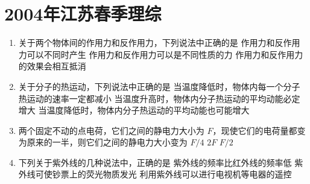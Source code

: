 \documentclass[\gkver]{gaokaozhenti}
\begin{document}
\chapter{2004年江苏春季理综}

\begin{enumerate}
\item
关于两个物体间的作用力和反作用力，下列说法中正确的是
{作用力和反作用力可以不同时产生}
{作用力和反作用力可以是不同性质的力}
{作用力和反作用力的效果会相互抵消}

\item
关于分子的热运动，下列说法中正确的是
{当温度降低时，物体内每一个分子热运动的速率一定都减小}
{当温度升高时，物体内分子热运动的平均动能必定增大}
{当温度降低时，物体内分子热运动的平均动能也可能增大}

\item
两个固定不动的点电荷，它们之间的静电力大小为 $F$，现使它们的电荷量都变为原来的一半，则它们之间的静电力大小变为
{$F/4$}
{$2F$}
{$F/2$}

\item
下列关于紫外线的几种说法中，正确的是
{紫外线的频率比红外线的频率低}
{紫外线可使钞票上的荧光物质发光}
{利用紫外线可以进行电视机等电器的遥控}


\end{enumerate}
\end{document}
